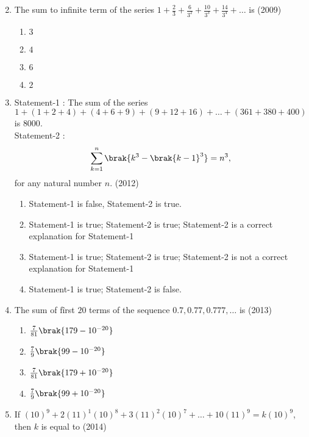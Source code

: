\begin{enumerate}[label=\thesubsection.\arabic*,ref=\thesubsection.\theenumi]
\begin{multicols}{4}
\begin{enumerate}
    \end{enumerate}
\end{multicols}
    \item The sum to infinite term of the series $1+\frac{2}{3}+\frac{6}{3^2}+\frac{10}{3^3}+\frac{14}{3^4}+\dots$ is
    \hfill(2009)
    \begin{multicols}{4}
\begin{enumerate}    
    \item $3$
    \item $4$
    \item $6$
    \item $2$
    \end{enumerate}
\end{multicols}
%
    \item 
    Statement-1 : The sum of the series $$1+(1+2+4)+(4+6+9)+(9+12+16)+\dots+(361+380+400)$$ is $8000$.    
  \\ 
    Statement-2 : $$\sum\limits_{k=1}^n\brak{k^3-\brak{k-1}^3}=n^3, $$ for any natural number $n$.
    \hfill(2012)
\begin{enumerate}    
    \item Statement-1 is false,  Statement-2 is true.
    \item Statement-1 is true;  Statement-2 is true;  Statement-2 is a correct explanation for Statement-1
    \item Statement-1 is true;  Statement-2 is true;  Statement-2 is not a correct explanation for Statement-1
    \item Statement-1 is true;  Statement-2 is false.
    \end{enumerate}
%        
    \item The sum of fîrst $20$ terms of the sequence $0.7, 0.77, 0.777, \dots$ is 
    \hfill(2013)
%    
    \begin{multicols}{4}
\begin{enumerate}    
    \item$\frac{7}{81}\brak{179-10^{-20}}$
    \item$\frac{7}{9}\brak{99-10^{-20}}$
    \item$\frac{7}{81}\brak{179+10^{-20}}$
    \item$\frac{7}{9}\brak{99+10^{-20}}$
    \end{enumerate}
\end{multicols}
%
    \item If $(10)^9+2(11)^1(10)^8+3(11)^2(10)^7+\dots+10(11)^9=k(10)^9$,  then $k$ is equal to
%    
    \hfill(2014)
    \begin{multicols}{4}

\end{multicols}
\end{enumerate}

